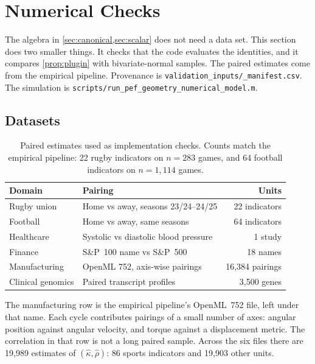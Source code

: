 \section{Numerical Checks}
\label{sec:numerical}

The algebra in \cref{sec:canonical,sec:scalar} does not need a data set.
This section does two smaller things.
It checks that the code evaluates the identities, and it compares \cref{prop:plugin} with bivariate-normal samples.
The paired estimates come from the empirical pipeline.
Provenance is \texttt{validation\_inputs/\_manifest.csv}.
The simulation is \texttt{scripts/run\_pef\_geometry\_numerical\_model.m}.

\subsection{Datasets}
\label{sec:val_datasets}

\begin{table}[t]
  \centering
  \caption{Paired estimates used as implementation checks.
    Counts match the empirical pipeline: 22 rugby indicators on $n=283$ games, and 64 football indicators on $n=1{,}114$ games.}
  \label{tab:datasets}
  \small
  \begin{tabular}{@{}llr@{}}
    \toprule
    \textbf{Domain} & \textbf{Pairing} & \textbf{Units} \\
    \midrule
    Rugby union        & Home vs away, seasons 23/24--24/25 & 22 indicators \\
    Football           & Home vs away, same seasons         & 64 indicators \\
    Healthcare         & Systolic vs diastolic blood pressure & 1 study \\
    Finance            & S\&P~100 name vs S\&P~500          & 18 names \\
    Manufacturing      & OpenML 752, axis-wise pairings     & 16{,}384 pairings \\
    Clinical genomics  & Paired transcript profiles         & 3{,}500 genes \\
    \bottomrule
  \end{tabular}
\end{table}

The manufacturing row is the empirical pipeline's OpenML~752 file, left under that name.
Each cycle contributes pairings of a small number of axes: angular position against angular velocity, and torque against a displacement metric.
The correlation in that row is not a long paired sample.
Across the six files there are 19{,}989 estimates of $(\hat\kappa,\hat\rho)$: 86 sports indicators and 19{,}903 other units.

